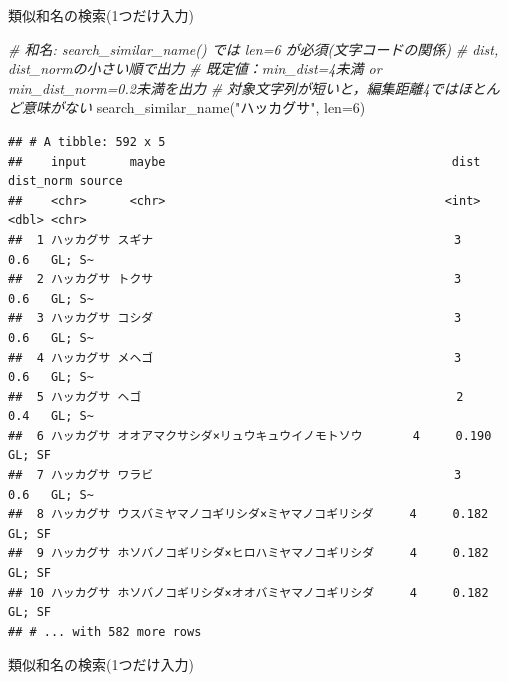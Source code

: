 \documentclass[
  a5paper,
  landscape,
  notitlepage]{report}
\newenvironment{Shaded}{\begin{snugshade}}{\end{snugshade}}
\newcommand{\AttributeTok}[1]{\textcolor[rgb]{0.77,0.63,0.00}{#1}}
\newcommand{\CommentTok}[1]{\textcolor[rgb]{0.56,0.35,0.01}{\textit{#1}}}
\newcommand{\DecValTok}[1]{\textcolor[rgb]{0.00,0.00,0.81}{#1}}
\newcommand{\FunctionTok}[1]{\textcolor[rgb]{0.00,0.00,0.00}{#1}}
\newcommand{\NormalTok}[1]{#1}
\newcommand{\StringTok}[1]{\textcolor[rgb]{0.31,0.60,0.02}{#1}}
\begin{document}
\newpage

\fontsize{32pt}{32pt}\selectfont

\begin{center}
類似和名の検索(1つだけ入力)
\end{center}

\fontsize{14pt}{14pt}\selectfont

\begin{Shaded}
\begin{Highlighting}[]
  \CommentTok{\# 和名: search\_similar\_name() では len=6 が必須(文字コードの関係)}
  \CommentTok{\# dist, dist\_normの小さい順で出力}
  \CommentTok{\# 既定値：min\_dist=4未満 or min\_dist\_norm=0.2未満を出力}
  \CommentTok{\# 対象文字列が短いと，編集距離4ではほとんど意味がない}
\FunctionTok{search\_similar\_name}\NormalTok{(}\StringTok{"ハッカグサ"}\NormalTok{, }\AttributeTok{len=}\DecValTok{6}\NormalTok{)}
\end{Highlighting}
\end{Shaded}

\begin{verbatim}
## # A tibble: 592 x 5
##    input      maybe                                        dist dist_norm source
##    <chr>      <chr>                                       <int>     <dbl> <chr> 
##  1 ハッカグサ スギナ                                          3     0.6   GL; S~
##  2 ハッカグサ トクサ                                          3     0.6   GL; S~
##  3 ハッカグサ コシダ                                          3     0.6   GL; S~
##  4 ハッカグサ メヘゴ                                          3     0.6   GL; S~
##  5 ハッカグサ ヘゴ                                            2     0.4   GL; S~
##  6 ハッカグサ オオアマクサシダ×リュウキュウイノモトソウ       4     0.190 GL; SF
##  7 ハッカグサ ワラビ                                          3     0.6   GL; S~
##  8 ハッカグサ ウスバミヤマノコギリシダ×ミヤマノコギリシダ     4     0.182 GL; SF
##  9 ハッカグサ ホソバノコギリシダ×ヒロハミヤマノコギリシダ     4     0.182 GL; SF
## 10 ハッカグサ ホソバノコギリシダ×オオバミヤマノコギリシダ     4     0.182 GL; SF
## # ... with 582 more rows
\end{verbatim}

\newpage

\fontsize{32pt}{32pt}\selectfont

\begin{center}
類似和名の検索(1つだけ入力)
\end{center}

\fontsize{14pt}{14pt}\selectfont
\end{document}
